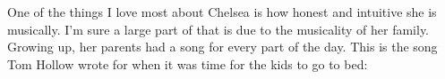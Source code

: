 One of the things I love most about Chelsea is how honest and intuitive she is musically. I'm sure a large part of that is due to the musicality of her family. Growing up, her parents had a song for every part of the day. This is the song Tom Hollow wrote for when it was time for the kids to go to bed:

\bigskip
